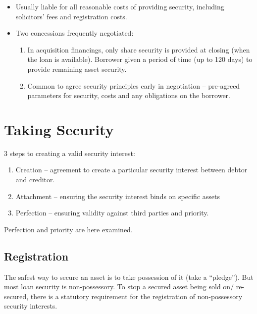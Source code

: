 \documentclass[
]{article}
\providecommand{\tightlist}{%
  \setlength{\itemsep}{0pt}\setlength{\parskip}{0pt}}
\begin{document}
\begin{itemize}
\tightlist
\item
  Usually liable for all reasonable costs of providing security,
  including solicitors' fees and registration costs.
\item
  Two concessions frequently negotiated:

  \begin{enumerate}
  \def\labelenumi{\arabic{enumi}.}
  \tightlist
  \item
    In acquisition financings, only share security is provided at
    closing (when the loan is available). Borrower given a period of
    time (up to 120 days) to provide remaining asset security.
  \item
    Common to agree security principles early in negotiation --
    pre-agreed parameters for security, costs and any obligations on the
    borrower.
  \end{enumerate}
\end{itemize}

\hypertarget{taking-security}{%
\section{Taking Security}\label{taking-security}}

3 steps to creating a valid security interest:

\begin{enumerate}
\def\labelenumi{\arabic{enumi}.}
\tightlist
\item
  Creation -- agreement to create a particular security interest between
  debtor and creditor.
\item
  Attachment -- ensuring the security interest binds on specific assets
\item
  Perfection -- ensuring validity against third parties and priority.
\end{enumerate}

Perfection and priority are here examined.

\hypertarget{registration}{%
\subsection{Registration}\label{registration}}

The safest way to secure an asset is to take possession of it (take a
``pledge''). But most loan security is non-possessory. To stop a secured
asset being sold on/ re-secured, there is a statutory requirement for
the registration of non-possessory security interests.
\end{document}
